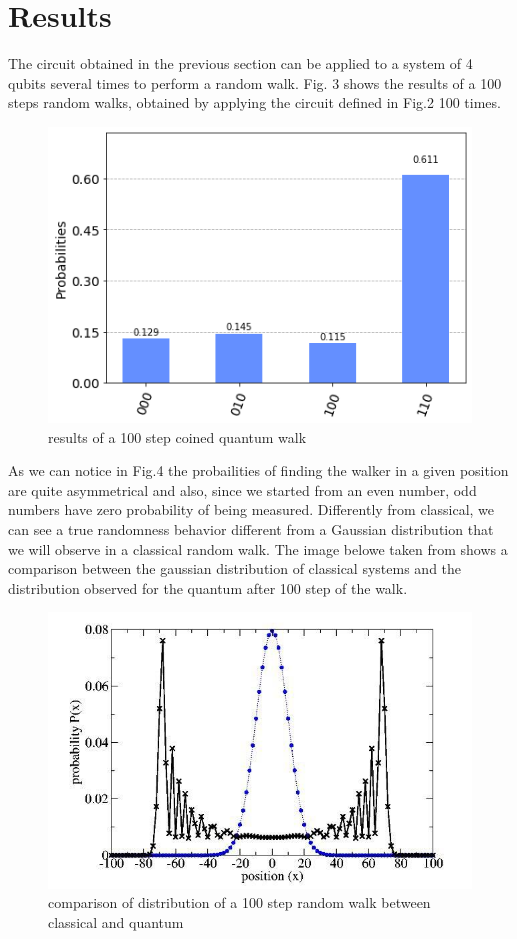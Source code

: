 \section{Results}

The circuit obtained in the previous section can be applied to a system of 4 qubits several times to perform a random walk. 
Fig. 3 shows the results of a 100 steps random walks, obtained by applying the circuit defined in Fig.2 100 times. 

\begin{figure}[h!]
    \includegraphics[scale=0.4]{img/100_steps_walk.png}
    \caption{results of a 100 step coined quantum walk}
    \centering
\end{figure}

As we can notice in Fig.4 the probailities of finding the walker in a given position are 
quite asymmetrical and also, since we started from an even number, odd numbers have zero probability of 
being measured. Differently from classical, we can 
see a true randomness behavior different from a Gaussian distribution that we will observe in a 
classical random walk. The image belowe taken from \cite{Kendon2004} shows a comparison between
the gaussian distribution of classical systems and the distribution observed for the quantum after 
100 step of the walk.

\begin{figure}[h!]
    \includegraphics[scale=0.5]{img/dist.jpg}
    \caption{comparison of distribution of a 100 step random walk between classical and quantum}
    \centering
\end{figure}

